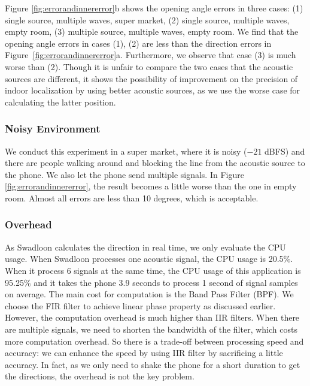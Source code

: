 \documentclass[]{sig-alternate-10pt}
\def \ourprotocol{Swadloon\xspace}
\begin{document}
Figure \ref{fig:errorandinnererror}b shows the opening angle
errors in three cases: (1) single source, multiple waves, super market, (2)
single source, multiple waves, empty room, (3) multiple source,
multiple waves, empty room.
We find that the opening angle  errors in
 cases (1), (2) are less than the direction errors in
 Figure~\ref{fig:errorandinnererror}a.
Furthermore, we observe that case (3) is much worse
 than (2).
Though it is unfair to compare the two cases that the
 acoustic sources are different, it shows the possibility of  improvement on the
 precision of indoor localization by using better acoustic sources, as
 we use the worse case for  calculating the latter position.

\subsubsection{Noisy Environment}
We conduct this experiment in a super market, where it is noisy ($-21$ dBFS) and there
 are people walking around and blocking the line from the acoustic source to the
 phone.
We also let the phone send multiple signals.  In Figure \ref{fig:errorandinnererror},
the result becomes a little worse than the one in empty room. Almost
all errors are less than 10 degrees, which is acceptable.


\subsubsection{Overhead}
As \ourprotocol calculates the direction in real time, we only
evaluate the CPU usage. When \ourprotocol processes
one acoustic signal, the CPU usage is 20.5\%. When it process
6 signals at the same time, the CPU usage of this application is
95.25\% and it takes the phone
3.9 seconds to process 1 second of signal samples on average. The main cost
for computation is the Band Pass Filter (BPF). We choose the FIR filter to
achieve linear phase property as discussed earlier. However, the
computation overhead is much higher than IIR filters. When there are
multiple signals, we need to shorten the bandwidth of the filter,
which costs more computation overhead. So there is a trade-off between
processing speed and accuracy:  we can enhance the speed by using IIR filter by sacrificing
a little accuracy. In fact, as we only need to shake the phone for a short duration to
get the directions, the overhead is not the key problem.
\end{document}
